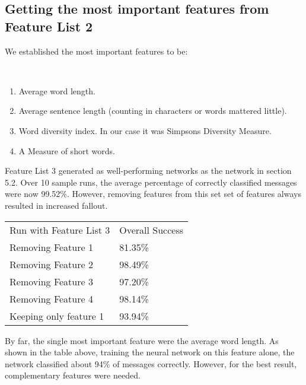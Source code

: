   \subsection{Getting the most important features from Feature List 2}
  We established the most important features to be:
  \label{sec:important-features}
    \begin{poem}\mbox{}\\[-\baselineskip]
      \begin{enumerate} \label{important-features}
        \item Average word length.
        \item Average sentence length (counting in characters or words mattered 
          little). 
        \item Word diversity index. In our case it was Simpsons Diversity
          Measure.  
        \item A Measure of short words. 
      \end{enumerate}     
    \end{poem}
    Feature List $3$ generated as well-performing networks as
    the network in section 5.2.  
    Over 10 sample runs, the average percentage of correctly
    classified messages were now 99.52\%.
    However, removing features from this set set of features always
    resulted in increased fallout. 
    \begin{table}[H]
      \begin{tabular}{ll}
        Run with Feature List 3      & Overall Success  \\
        Removing Feature 1           & 81.35\%          \\
        Removing Feature 2           & 98.49\%          \\ 
        Removing Feature 3           & 97.20\%          \\ 
        Removing Feature 4           & 98.14\%          \\ 
        Keeping only feature 1       & 93.94\%
      \end{tabular}
    \end{table}
    By far, the single most important feature were the average word length.
    As shown in the table above, training the neural network on this feature
    alone, the network classified about 94\% of messages correctly. However,
    for the best result, complementary features were needed.
    
